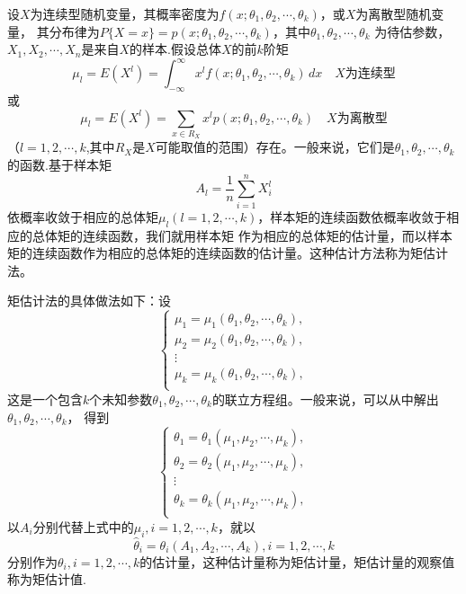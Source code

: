 \begin{definition}[矩估计法]
    设$X$为连续型随机变量，其概率密度为$f(x;\theta_1,\theta_2,\cdots,\theta_k)$，或$X$为离散型随机变量，
    其分布律为$P\{X=x\}=p(x;\theta_1,\theta_2,\cdots,\theta_k)$，其中$\theta_1,\theta_2,\cdots,\theta_k$
    为待估参数，$X_1,X_2,\cdots,X_n$是来自$X$的样本.假设总体$X$的前$k$阶矩
    $$\mu_l=E(X^l)=\int_{-\infty}^\infty x^lf(x;\theta_1,\theta_2,\cdots,\theta_k)\,dx\quad X\mbox{为连续型}$$
    或
    $$\mu_l=E(X^l)=\sum_{x\in R_X}x^lp(x;\theta_1,\theta_2,\cdots,\theta_k)\quad X\mbox{为离散型}$$
    （$l=1,2,\cdots,k$,其中$R_X$是$X$可能取值的范围）存在。一般来说，它们是$\theta_1,\theta_2,\cdots,\theta_k$
    的函数.基于样本矩
    $$A_l=\frac{1}{n}\sum_{i=1}^nX_i^l$$
    依概率收敛于相应的总体矩$\mu_l(l=1,2,\cdots,k)$，样本矩的连续函数依概率收敛于相应的总体矩的连续函数，我们就用样本矩
    作为相应的总体矩的估计量，而以样本矩的连续函数作为相应的总体矩的连续函数的估计量。这种估计方法称为{\heiti 矩估计法}。

    矩估计法的具体做法如下：设
    $$\left\{\begin{array}{l}
        \mu_1=\mu_1(\theta_1,\theta_2,\cdots,\theta_k),\\
        \mu_2=\mu_2(\theta_1,\theta_2,\cdots,\theta_k),\\
        \vdots\\
        \mu_k=\mu_k(\theta_1,\theta_2,\cdots,\theta_k),\\
    \end{array}\right.$$
    这是一个包含$k$个未知参数$\theta_1,\theta_2,\cdots,\theta_k$的联立方程组。一般来说，可以从中解出$\theta_1,\theta_2,\cdots,\theta_k$，
    得到
    $$\left\{\begin{array}{l}
        \theta_1=\theta_1(\mu_1,\mu_2,\cdots,\mu_k),\\
        \theta_2=\theta_2(\mu_1,\mu_2,\cdots,\mu_k),\\
        \vdots\\
        \theta_k=\theta_k(\mu_1,\mu_2,\cdots,\mu_k),\\
    \end{array}\right.$$
    以$A_i$分别代替上式中的$\mu_i,i=1,2,\cdots,k$，就以
    $$\hat{\theta}_i=\theta_i(A_1,A_2,\cdots,A_k),i=1,2,\cdots,k$$
    分别作为$\theta_i,i=1,2,\cdots,k$的估计量，这种估计量称为{\heiti 矩估计量}，矩估计量的观察值称为{\heiti 矩估计值}.
\end{definition}


